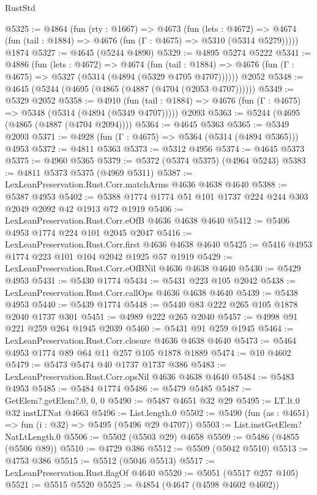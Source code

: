 \begin{lexlean}{RustStd}
\begin{coremodule}
@5325 := @4864
    (fun (rty : @1667) =>
    @4673
      (fun (lets : @4672) =>
      @4674 (fun (tail : @1884) => @4676 (fun (Γ : @4675) => @5310 (@5314 @5279)))))
    @1874
@5327 := @4645 (@5244 @4890)
@5329 := @4895 @5274 @5222
@5341 := @4886
    (fun (lets : @4672) =>
    @4674
      (fun (tail : @1884) => @4676 (fun (Γ : @4675) => @5327 (@5314 (@4894 (@5329 @4705 @4707))))))
    @2052
@5348 := @4645 (@5244 (@4695 (@4865 (@4887 (@4704 (@2053 @4707))))))
@5349 := @5329 @2052
@5358 := @4910
    (fun (tail : @1884) => @4676 (fun (Γ : @4675) => @5348 (@5314 (@4894 (@5349 @4707)))))
    @2093
@5363 := @5244 (@4695 (@4865 (@4887 (@4704 @2094))))
@5364 := @4645 @5363
@5365 := @5349 @2093
@5371 := @4928 (fun (Γ : @4675) => @5364 (@5314 (@4894 @5365))) @4953
@5372 := @4811 @5363
@5373 := @5312 @4956
@5374 := @4645 @5373
@5375 := @4960 @5365
@5379 := @5372 (@5374 @5375) (@4964 @5243)
@5383 := @4811 @5373 @5375 (@4969 @5311)
@5387 := LexLeanPreservation.Rust.Corr.matchArms @4636 @4638 @4640
@5388 := @5387 @4953
@5402 := @5388 @1774 @1774 @51 @101 @1737 @224 @244 @303 @2049 @2092 @42 @1913 @72 @1919
@5406 := LexLeanPreservation.Rust.Corr.eOfB @4636 @4638 @4640
@5412 := @5406 @4953 @1774 @224 @101 @2045 @2047
@5416 := LexLeanPreservation.Rust.Corr.first @4636 @4638 @4640
@5425 := @5416 @4953 @1774 @223 @101 @104 @2042 @1925 @57 @1919
@5429 := LexLeanPreservation.Rust.Corr.eOfBNil @4636 @4638 @4640
@5430 := @5429 @4953
@5431 := @5430 @1774
@5434 := @5431 @223 @105 @2042
@5438 := LexLeanPreservation.Rust.Corr.callOps @4636 @4638 @4640
@5439 := @5438 @4953
@5440 := @5439 @1774
@5448 := @5440 @83 @222 @265 @105 @1878 @2040 @1737 @301
@5451 := @4989 @222 @265 @2040
@5457 := @4998 @91 @221 @259 @264 @1945 @2039
@5460 := @5431 @91 @259 @1945
@5464 := LexLeanPreservation.Rust.Corr.closure @4636 @4638 @4640
@5473 := @5464 @4953 @1774 @89 @64 @11 @257 @105 @1878 @1889
@5474 := @10 @4602
@5479 := @5473 @5474 @40 @1737 @1737 @386
@5483 := LexLeanPreservation.Rust.Corr.opsNil @4636 @4638 @4640
@5484 := @5483 @4953
@5485 := @5484 @1774
@5486 := @5479 @5485
@5487 := GetElem?.getElem?.{0, 0, 0}
@5490 := @5487 @4651 @32 @29
@5495 := LT.lt.{0} @32 instLTNat @4663
@5496 := List.length.{0}
@5502 := @5490 (fun (as : @4651) => fun (i : @32) => @5495 (@5496 @29 @4707))
@5503 := List.instGetElem?NatLtLength.{0}
@5506 := @5502 (@5503 @29) @4658
@5509 := @5486 (@4855 (@5506 @89))
@5510 := @4729 @386
@5512 := @5509 (@5042 @5510)
@5513 := @4753 @386
@5515 := @5512 (@5046 @5513)
@5517 := LexLeanPreservation.Rust.flagOf @4640
@5520 := @5051 (@5517 @257 @105)
@5521 := @5515 @5520
@5525 := @4854 (@4647 (@4598 @4602 @4602))

\end{coremodule}
\end{lexlean}
